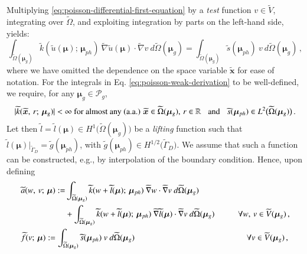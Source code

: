 \documentclass{elsarticle}
\theoremstyle{theorem}
\theoremstyle{definition}
\theoremstyle{remark}
\theoremstyle{proposition}
\numberwithin{figure}{section}
\newcommand{\wt}[1]{\widetilde{#1}}
\newcommand{\bg}[1]{\boldsymbol{#1}}
\begin{document}
		Multiplying \eqref{eq:poisson-differential-first-equation} by a \emph{test} function $v \in \wt{V}$, integrating over $\wt{\Omega}$, and exploiting integration by parts on the left-hand side, yields:
		\begin{equation}
			\label{eq:poisson-weak-derivation}
			\int_{\wt{\Omega}(\bg{\mu}_g)} \wt{k}(\wt{u}(\bg{\mu}); \, \bg{\mu}_{ph}) ~ \wt{\nabla} \wt{u}(\bg{\mu}) \cdot \wt{\nabla} v ~ d\wt{\Omega}(\bg{\mu}_g) = \int_{\wt{\Omega}(\bg{\mu}_g)} \wt{s}(\bg{\mu}_{ph}) ~ v ~ d\wt{\Omega}(\bg{\mu}_g) \, ,
		\end{equation}
		where we have omitted the dependence on the space variable $\wt{\bg{x}}$ for ease of notation. For the integrals in Eq. \eqref{eq:poisson-weak-derivation} to be well-defined, we require, for any $\bg{\mu}_g \in \mathcal{P}_g$, 
		\begin{equation*}
			\text{$|\wt{k}(\wt{\bg{x}}, \, r; \, \bg{\mu}_g)| < \infty$ for almost any (a.a.) $\wt{\bg{x}} \in \wt{\Omega}(\bg{\mu}_g), \, r \in \mathbb{R}$}  \hspace*{0.3cm} \text{and} \hspace*{0.3cm} \wt{s}(\bg{\mu}_{ph}) \in L^2 \big( \wt{\Omega}(\bg{\mu}_g) \big) \, .
		\end{equation*}
		Let then $\wt{l} = \wt{l}(\bg{\mu}) \in H^1 \big( \wt{\Omega}(\bg{\mu}_g) \big)$ be a \emph{lifting} function such that $\wt{l}(\bg{\mu}) \big\rvert_{\wt{\Gamma}_D} = \wt{g}(\bg{\mu}_{ph})$, with $\wt{g}(\bg{\mu}_{ph}) \in H^{1/2} \big( \wt{\Gamma}_D \big)$. We assume that such a function can be constructed, e.g., by interpolation of the boundary condition. Hence, upon defining
		\begin{subequations}
			\label{eq:poisson-weak-forms}
			\begin{align}
				&
				\begin{aligned}
				\wt{a}(w, \, v; \, \bg{\mu}) := & \int_{\wt{\Omega}(\bg{\mu}_g)} \wt{k}(w + \wt{l}(\bg{\mu}); \, \bg{\mu}_{ph}) ~ \wt{\nabla} w \cdot \wt{\nabla} v ~ d\wt{\Omega}(\bg{\mu}_g) \\
				& + \int_{\wt{\Omega}(\bg{\mu}_g)} \wt{k}(w + \wt{l}(\bg{\mu}); \, \bg{\mu}_{ph}) ~ \wt{\nabla} \wt{l}(\bg{\mu}) \cdot \wt{\nabla} v ~ d\wt{\Omega}(\bg{\mu}_g) \hspace*{1cm} \forall w, \, v \in \wt{V}(\bg{\mu}_g) \, , 
				\end{aligned} \\
				& \wt{f}(v; \, \bg{\mu}) := \int_{\wt{\Omega}(\bg{\mu}_g)} \wt{s}(\bg{\mu}_{ph}) ~ v ~ d\wt{\Omega}(\bg{\mu}_g) \hspace*{1cm} \hspace*{3.775cm} \forall v \in \wt{V}(\bg{\mu}_g) \, ,
			\end{align}
		\end{subequations}
\end{document}
